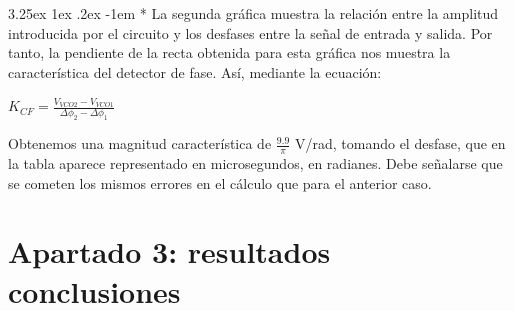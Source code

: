 \documentclass[12pt]{article}
\makeatletter
\renewcommand\paragraph{\@startsection{paragraph}{5}{\z@}%
  {3.25ex \@plus1ex \@minus.2ex}%
  {-1em}%
  {\normalfont\normalsize\bfseries}}
\makeatother
\begin{document}
    \paragraph*{}
    La segunda gráfica muestra la relación entre la amplitud introducida por el circuito y los desfases entre la señal de entrada y salida. Por tanto, la pendiente de la recta obtenida
para esta gráfica nos muestra la característica del detector de fase. Así, mediante la ecuación:

  \begin{center}
    $K_{CF} = \frac{V_{VCO2} - V_{VCO1}}{\Delta\phi_{2} - \Delta\phi_{1}}$
  \end{center}
    
  Obtenemos una magnitud característica de $\frac{9.9}{\pi}$ V/rad, tomando el desfase, que en la tabla aparece representado en microsegundos, en radianes. Debe señalarse que se cometen los mismos errores en el cálculo que para el anterior caso.

    \section{Apartado 3: resultados conclusiones}

    
\end{document}
